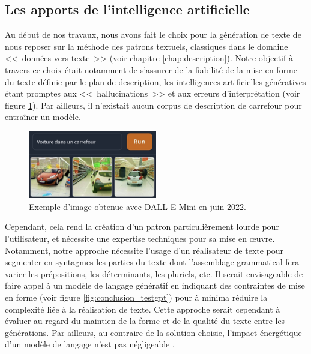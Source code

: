 \subsection{Les apports de l'intelligence artificielle}

Au début de nos travaux, nous avons fait le choix pour la génération de texte de nous reposer sur la méthode des patrons textuels, classiques dans le domaine <<~données vers texte~>> (voir chapitre \ref{chap:description}). Notre objectif à travers ce choix était notamment de s'assurer de la fiabilité de la mise en forme du texte définie par le plan de description, les intelligences artificielles génératives étant promptes aux <<~hallucinations~>> \citep{ye2023} et aux erreurs d'interprétation (voir figure \ref{fig:conclusion_dallemini}). Par ailleurs, il n'existait aucun corpus de description de carrefour pour entraîner un modèle.

\begin{figure}[ht]
    \centering
    \includegraphics[width=0.5\textwidth]{images/conclusion/dallemini_voiture.jpeg}
    \caption[Une voiture dans un carrefour]{Exemple d'image obtenue avec DALL-E Mini en juin 2022.}
    \label{fig:conclusion_dallemini}
\end{figure}

Cependant, cela rend la création d'un patron particulièrement lourde pour l'utilisateur, et nécessite une expertise techniques pour sa mise en œuvre. Notamment, notre approche nécessite l'usage d'un réalisateur de texte pour segmenter en syntagmes les parties du texte dont l'assemblage grammatical fera varier les prépositions, les déterminants, les pluriels, etc. Il serait envisageable de faire appel à un modèle de langage génératif en indiquant des contraintes de mise en forme \citep{white2023prompt} (voir figure \ref{fig:conclusion_testgpt}) pour à minima réduire la complexité liée à la réalisation de texte. Cette approche serait cependant à évaluer au regard du maintien de la forme et de la qualité du texte entre les générations. Par ailleurs, au contraire de la solution choisie, l'impact énergétique d'un modèle de langage n'est pas négligeable \citep{devries2023}.

